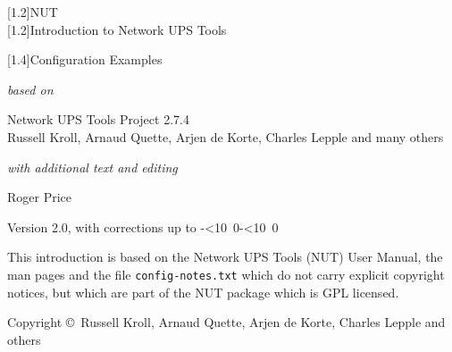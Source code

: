 \documentclass[12pt]{article}
\def\isodate{\leavevmode\hbox{\the\year-\twodigits\month-\twodigits\day}}
\def\twodigits#1{\ifnum#1<10 0\fi\the#1}
\newcommand{\Version}{2.0}
\renewcommand{\thepage}{}            %
\begin{document}
\begin{center}
\scalebox{1.0}[1.2]{\textsf{\Huge{NUT}}} \\[6mm]
\scalebox{1.0}[1.2]{\textsf{\Huge{Introduction to Network UPS Tools}}} \\

\vspace*{\fill}

\scalebox{1.2}[1.4]{\textsf{\Huge{Configuration Examples}}} \\

\vspace*{\fill}

\textsl{based on}
\vspace{4mm}

\textsf{\Large{Network UPS Tools Project 2.7.4}} \\
\textsf{\normalsize Russell Kroll},
\textsf{\normalsize Arnaud Quette},
\textsf{\normalsize Arjen de Korte},
\textsf{\normalsize Charles Lepple and many others}
\vspace*{\fill}

\textsl{with additional text and editing}
\vspace{4mm}

\textsf{\normalsize Roger Price}

\vspace*{\fill}

\textsf{Version \Version, with corrections up to \isodate} \\
\end{center}

\vspace*{\fill}

\renewcommand{\thepage}{\roman{page}}

This introduction is based on the Network UPS Tools (NUT) User Manual, the man
pages and the file \texttt{config-notes.txt} which do not carry explicit
copyright notices, but which are part of the NUT package which is GPL
licensed.

\vspace{5mm}

\textsf{Copyright \copyright\ Russell Kroll, Arnaud Quette, Arjen de Korte,
  Charles Lepple and others}

\vspace{5mm}
\end{document}
